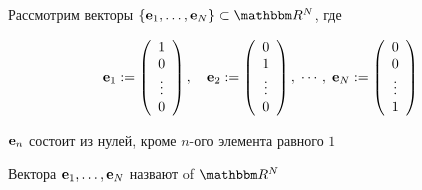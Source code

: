 

    
    


\begin{frame}
    
    \vspace{2em}
    \Eg 
    Рассмотрим векторы $\{\bolde_1, \ldots, \bolde_N\} \subset \RR^N$, где

    \begin{equation*}
        {\mathbf e}_1 := 
        \left(
        \begin{array}{c}
            1 \\
            0 \\
            \vdots \\
            0
        \end{array}
        \right),
        \quad 
        {\mathbf e}_2 := 
        \left(
        \begin{array}{c}
            0 \\
            1 \\
            \vdots \\
            0
        \end{array}
        \right),
        \; 
        \cdots,
        \;
        {\mathbf e}_N := 
        \left(
        \begin{array}{c}
            0 \\
            0 \\
            \vdots \\
            1
        \end{array}
        \right)
    \end{equation*}

    \vspace{1em}

    ${\mathbf e}_n$ состоит из нулей, кроме $n$-ого элемента равного $1$
    
    \vspace{1em}

    Вектора ${\mathbf e}_1, \ldots, {\mathbf e}_N$ назвают
     of $\RR^N$

\end{frame}

